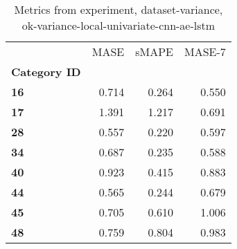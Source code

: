 \begin{table}[h]
\centering
\caption{Metrics from experiment, dataset-variance, ok-variance-local-univariate-cnn-ae-lstm}
\label{table:ok-variance-local-univariate-cnn-ae-lstm-dataset-variance}
\begin{tabular}{lrrr}
\toprule
{} &   MASE &  sMAPE &  MASE-7 \\
\textbf{Category ID} &        &        &         \\
\midrule
\textbf{16         } &  0.714 &  0.264 &   0.550 \\
\textbf{17         } &  1.391 &  1.217 &   0.691 \\
\textbf{28         } &  0.557 &  0.220 &   0.597 \\
\textbf{34         } &  0.687 &  0.235 &   0.588 \\
\textbf{40         } &  0.923 &  0.415 &   0.883 \\
\textbf{44         } &  0.565 &  0.244 &   0.679 \\
\textbf{45         } &  0.705 &  0.610 &   1.006 \\
\textbf{48         } &  0.759 &  0.804 &   0.983 \\
\bottomrule
\end{tabular}
\end{table}
